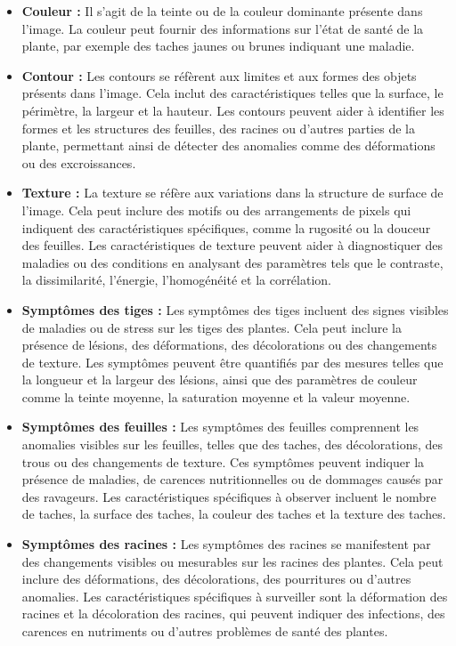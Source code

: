 \documentclass{article}
\begin{document}
		\begin{itemize}
		\item \textbf{ Couleur :} Il s'agit de la teinte ou de la couleur dominante présente dans l'image. La couleur peut fournir des informations sur l'état de santé de la plante, par exemple des taches jaunes ou brunes indiquant une maladie.
		
		\item \textbf{ Contour :} Les contours se réfèrent aux limites et aux formes des objets présents dans l'image. Cela inclut des caractéristiques telles que la surface, le périmètre, la largeur et la hauteur. Les contours peuvent aider à identifier les formes et les structures des feuilles, des racines ou d'autres parties de la plante, permettant ainsi de détecter des anomalies comme des déformations ou des excroissances.
		
		\item \textbf{ Texture :} La texture se réfère aux variations dans la structure de surface de l'image. Cela peut inclure des motifs ou des arrangements de pixels qui indiquent des caractéristiques spécifiques, comme la rugosité ou la douceur des feuilles. Les caractéristiques de texture peuvent aider à diagnostiquer des maladies ou des conditions en analysant des paramètres tels que le contraste, la dissimilarité, l'énergie, l'homogénéité et la corrélation.
		
		\item \textbf{ Symptômes des tiges :} Les symptômes des tiges incluent des signes visibles de maladies ou de stress sur les tiges des plantes. Cela peut inclure la présence de lésions, des déformations, des décolorations ou des changements de texture. Les symptômes peuvent être quantifiés par des mesures telles que la longueur et la largeur des lésions, ainsi que des paramètres de couleur comme la teinte moyenne, la saturation moyenne et la valeur moyenne.
		
		\item \textbf{ Symptômes des feuilles :} Les symptômes des feuilles comprennent les anomalies visibles sur les feuilles, telles que des taches, des décolorations, des trous ou des changements de texture. Ces symptômes peuvent indiquer la présence de maladies, de carences nutritionnelles ou de dommages causés par des ravageurs. Les caractéristiques spécifiques à observer incluent le nombre de taches, la surface des taches, la couleur des taches et la texture des taches.
		
		\item \textbf{ Symptômes des racines :} Les symptômes des racines se manifestent par des changements visibles ou mesurables sur les racines des plantes. Cela peut inclure des déformations, des décolorations, des pourritures ou d'autres anomalies. Les caractéristiques spécifiques à surveiller sont la déformation des racines et la décoloration des racines, qui peuvent indiquer des infections, des carences en nutriments ou d'autres problèmes de santé des plantes.

		\end{itemize}
		
\end{document}
